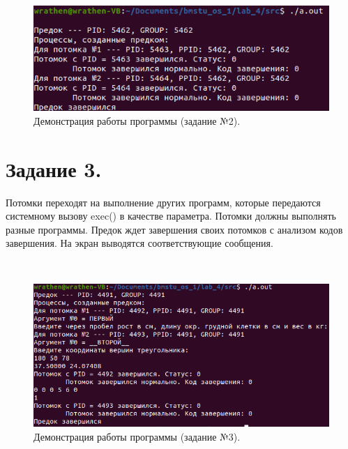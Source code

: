 \documentclass[12pt]{report}
\begin{document}
	\begin{figure}[H]
	
		\centering
		
		\includegraphics[width=\linewidth]{img/task_02.png}
		\caption{Демонстрация работы программы (задание №2).}
		
		\label{fig:task_02}
	
	\end{figure}

	\section*{Задание 3.}
	Потомки переходят на выполнение других программ, которые передаются
	системному вызову exec() в качестве параметра.
	Потомки должны выполнять разные программы.
	Предок ждет завершения своих потомков с анализом кодов завершения.
	На экран выводятся соответствующие сообщения.
	
	\begin{lstlisting}[label=code:exec, caption=exec(), language=C]
		
	\end{lstlisting}

	\begin{figure}[H]
	
		\centering
		
		\includegraphics[width=\linewidth]{img/task_03.png}
		\caption{Демонстрация работы программы (задание №3).}
		
		\label{fig:task_03}
	
	\end{figure}
\end{document}
